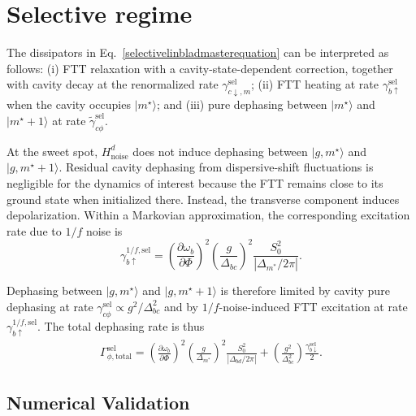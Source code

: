 \section*{Selective regime}
\label{subsec:selective_analytical}

The dissipators in Eq.~\eqref{selectivelinbladmasterequation} can be interpreted as follows: (i) FTT relaxation with a cavity-state-dependent correction, together with cavity decay at the renormalized rate $\gamma_{c\downarrow,m}^{\mathrm{sel}}$; (ii) FTT heating at rate $\gamma_{b\uparrow}^{\mathrm{sel}}$ when the cavity occupies $|m^\star\rangle$; and (iii) pure dephasing between $|m^\star\rangle$ and $|m^\star+1\rangle$ at rate $\widetilde{\gamma}_{c\phi}^{\mathrm{sel}}$.

At the sweet spot, $H_{\mathrm{noise}}^{d}$ does not induce dephasing between $|g,m^\star\rangle$ and $|g,m^\star+1\rangle$. Residual cavity dephasing from dispersive-shift fluctuations is negligible for the dynamics of interest because the FTT remains close to its ground state when initialized there. Instead, the transverse component induces depolarization. Within a Markovian approximation, the corresponding excitation rate due to $1/f$ noise is
\begin{equation}
\label{selective1/f}
\gamma_{b\uparrow}^{1/f,\mathrm{sel}}
= \left( \frac{\partial \omega_b}{\partial \Phi} \right)^2
\left( \frac{g}{\Delta_{bc}} \right)^2
\frac{S_0^2}{|\Delta_{m^\ast}/2\pi|} .
\end{equation}

Dephasing between $|g,m^\star\rangle$ and $|g,m^\star+1\rangle$ is therefore limited by cavity pure dephasing at rate $\gamma_{c\phi}^{\mathrm{sel}} \propto g^2/\Delta_{bc}^2$ and by $1/f$-noise-induced FTT excitation at rate $\gamma_{b\uparrow}^{1/f,\mathrm{sel}}$. The total dephasing rate is thus
\begin{align}
\label{eq:Gamma_phi_total_selective}
\Gamma^{\mathrm{sel}}_{\phi,\mathrm{total}}
= \left( \frac{\partial \omega_b}{\partial \Phi} \right)^2
\left( \frac{g}{\Delta_{m^\ast}} \right)^2
\frac{S_0^2}{|\Delta_{bd}/2\pi|}
+ \left( \frac{g^2}{\Delta_{bc}^2} \right)\frac{\gamma_{b\downarrow}^{\mathrm{sel}}}{2}.
\end{align}

\subsection{Numerical Validation}
\label{subsec:mc-validation}

